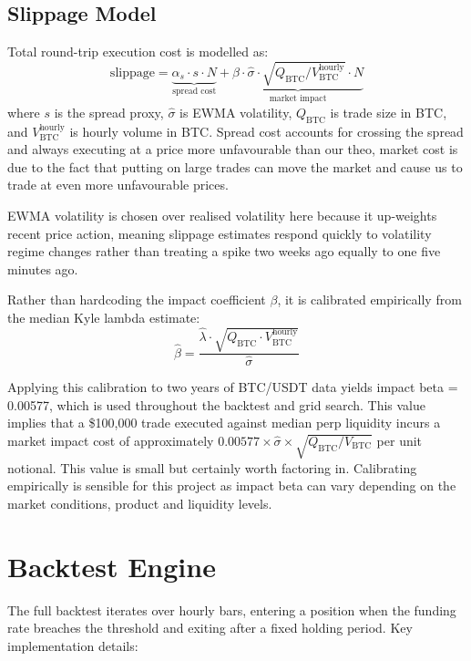 \documentclass[11pt,a4paper]{article}
\begin{document}
\subsection{Slippage Model}

Total round-trip execution cost is modelled as:
\[
    \text{slippage} = \underbrace{\alpha_s \cdot s \cdot N}_{\text{spread cost}}
    + \underbrace{\beta \cdot \hat{\sigma} \cdot \sqrt{Q_{\text{BTC}} /
    V_{\text{BTC}}^{\text{hourly}}} \cdot N}_{\text{market impact}}
\]
where $s$ is the spread proxy, $\hat{\sigma}$ is EWMA volatility, $Q_{\text{BTC}}$
is trade size in BTC, and $V_{\text{BTC}}^{\text{hourly}}$ is hourly
volume in BTC. Spread cost accounts for crossing the spread and always executing at a price more unfavourable than our theo, market cost is due to the fact that putting on large trades can move the market and cause us to trade at even more unfavourable prices.

EWMA volatility is chosen over realised volatility here because it up-weights recent price action, meaning slippage estimates respond quickly to volatility regime changes rather than treating a spike two weeks ago equally to one five minutes ago.

Rather than hardcoding the impact coefficient $\beta$, it is calibrated
empirically from the median Kyle lambda estimate:
\[
    \hat{\beta} = \frac{\hat{\lambda} \cdot \sqrt{Q_{\text{BTC}}
    \cdot V_{\text{BTC}}^{\text{hourly}}}}{\hat{\sigma}}
\]

Applying this calibration to two years of BTC/USDT data yields 
impact beta = 0.00577, which is used throughout the backtest and grid search. This value implies that 
a \$100{,}000 trade executed against median perp liquidity incurs a 
market impact cost of approximately 
$0.00577 \times \hat{\sigma} \times \sqrt{Q_{\text{BTC}} / V_{\text{BTC}}}$ 
per unit notional. This value is small but certainly worth factoring in. Calibrating empirically is sensible for this project as impact beta can vary depending on the market conditions, product and liquidity levels.


\section{Backtest Engine}

The full backtest iterates over hourly bars, entering a position when the
funding rate breaches the threshold and exiting after a fixed holding period.
Key implementation details:
\end{document}
